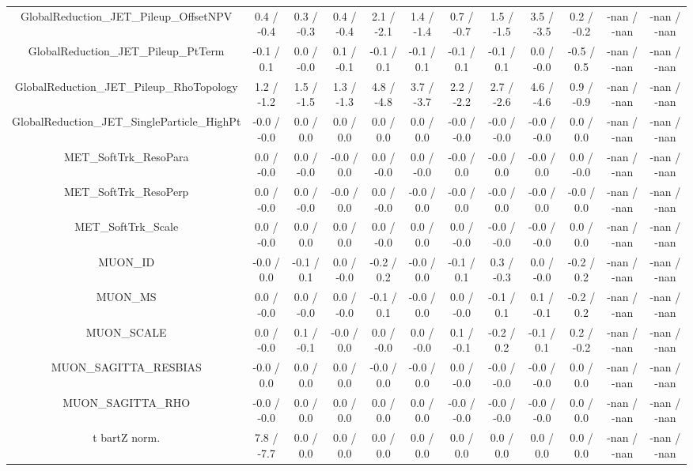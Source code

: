 \begin{table}[htbp]
\begin{center}
\begin{tabular}{|c|c|c|c|c|c|c|c|c|c|c|c|}
  GlobalReduction_JET_Pileup_OffsetNPV & 0.4 / -0.4 & 0.3 / -0.3 & 0.4 / -0.4 & 2.1 / -2.1 & 1.4 / -1.4 & 0.7 / -0.7 & 1.5 / -1.5 & 3.5 / -3.5 & 0.2 / -0.2 & -nan / -nan & -nan / -nan \\ 
  GlobalReduction_JET_Pileup_PtTerm & -0.1 / 0.1 & 0.0 / -0.0 & 0.1 / -0.1 & -0.1 / 0.1 & -0.1 / 0.1 & -0.1 / 0.1 & -0.1 / 0.1 & 0.0 / -0.0 & -0.5 / 0.5 & -nan / -nan & -nan / -nan \\ 
  GlobalReduction_JET_Pileup_RhoTopology & 1.2 / -1.2 & 1.5 / -1.5 & 1.3 / -1.3 & 4.8 / -4.8 & 3.7 / -3.7 & 2.2 / -2.2 & 2.7 / -2.6 & 4.6 / -4.6 & 0.9 / -0.9 & -nan / -nan & -nan / -nan \\ 
  GlobalReduction_JET_SingleParticle_HighPt & -0.0 / -0.0 & 0.0 / 0.0 & 0.0 / 0.0 & 0.0 / 0.0 & 0.0 / 0.0 & -0.0 / -0.0 & -0.0 / -0.0 & -0.0 / -0.0 & 0.0 / 0.0 & -nan / -nan & -nan / -nan \\ 
  MET_SoftTrk_ResoPara & 0.0 / -0.0 & 0.0 / -0.0 & -0.0 / 0.0 & 0.0 / -0.0 & 0.0 / -0.0 & -0.0 / 0.0 & -0.0 / 0.0 & -0.0 / 0.0 & 0.0 / -0.0 & -nan / -nan & -nan / -nan \\ 
  MET_SoftTrk_ResoPerp & 0.0 / -0.0 & 0.0 / -0.0 & -0.0 / 0.0 & 0.0 / -0.0 & -0.0 / 0.0 & -0.0 / 0.0 & -0.0 / 0.0 & -0.0 / 0.0 & -0.0 / 0.0 & -nan / -nan & -nan / -nan \\ 
  MET_SoftTrk_Scale & 0.0 / -0.0 & 0.0 / 0.0 & 0.0 / 0.0 & 0.0 / -0.0 & 0.0 / 0.0 & 0.0 / -0.0 & -0.0 / -0.0 & -0.0 / -0.0 & 0.0 / 0.0 & -nan / -nan & -nan / -nan \\ 
  MUON_ID & -0.0 / 0.0 & -0.1 / 0.1 & 0.0 / -0.0 & -0.2 / 0.2 & -0.0 / 0.0 & -0.1 / 0.1 & 0.3 / -0.3 & 0.0 / -0.0 & -0.2 / 0.2 & -nan / -nan & -nan / -nan \\ 
  MUON_MS & 0.0 / -0.0 & 0.0 / -0.0 & 0.0 / -0.0 & -0.1 / 0.1 & -0.0 / 0.0 & 0.0 / -0.0 & -0.1 / 0.1 & 0.1 / -0.1 & -0.2 / 0.2 & -nan / -nan & -nan / -nan \\ 
  MUON_SCALE & 0.0 / -0.0 & 0.1 / -0.1 & -0.0 / 0.0 & 0.0 / -0.0 & 0.0 / -0.0 & 0.1 / -0.1 & -0.2 / 0.2 & -0.1 / 0.1 & 0.2 / -0.2 & -nan / -nan & -nan / -nan \\ 
  MUON_SAGITTA_RESBIAS & -0.0 / 0.0 & 0.0 / 0.0 & 0.0 / 0.0 & -0.0 / 0.0 & -0.0 / 0.0 & 0.0 / -0.0 & -0.0 / -0.0 & -0.0 / -0.0 & 0.0 / 0.0 & -nan / -nan & -nan / -nan \\ 
  MUON_SAGITTA_RHO & -0.0 / -0.0 & 0.0 / 0.0 & 0.0 / 0.0 & 0.0 / 0.0 & 0.0 / 0.0 & -0.0 / -0.0 & -0.0 / -0.0 & -0.0 / -0.0 & 0.0 / 0.0 & -nan / -nan & -nan / -nan \\ 
  t bar{t}Z norm. & 7.8 / -7.7 & 0.0 / 0.0 & 0.0 / 0.0 & 0.0 / 0.0 & 0.0 / 0.0 & 0.0 / 0.0 & 0.0 / 0.0 & 0.0 / 0.0 & 0.0 / 0.0 & -nan / -nan & -nan / -nan \\ 

\end{tabular}
\end{center}
\end{table}
